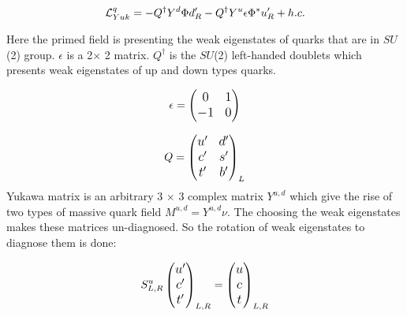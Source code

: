 \begin{equation}
\large
\mathcal{L}_{Yuk}^q = 
-{Q}^\dag Y^d \Phi d_R^\prime 
-{Q}^\dag Y^u \epsilon \Phi^* u_R^\prime
+ h.c.
\end{equation}

Here the primed field is presenting the weak eigenstates of quarks that are in $SU$(2) group. $\epsilon$ is a 2$\times$ 2 matrix. $Q^\dag$ is the $SU$(2) left-handed doublets which presents weak eigenstates of up and down types quarks. 

\begin{equation}
\large
\epsilon =  
\begin{pmatrix}
0 & 1\\
-1 & 0
\end{pmatrix}
\end{equation}

\begin{equation}
\large
Q =  
\begin{pmatrix}
u^\prime & d^\prime \\
c^\prime & s^\prime \\
t^\prime & b^\prime
\end{pmatrix}_L
\end{equation}
Yukawa matrix is an arbitrary 3 $\times$ 3 complex matrix $Y^{u,d}$ which give the rise of two types of massive quark field $M^{u,d}=Y^{u,d}\nu$. The choosing the weak eigenstates makes these matrices un-diagnosed. So the rotation of weak eigenstates to diagnose them is done:

\begin{equation}
\large
S_{L,R}^{u}
\begin{pmatrix}
u^\prime   \\
c^\prime  \\
t^\prime 
\end{pmatrix}_{L,R}
= \begin{pmatrix}
u  \\
c  \\
t 
\end{pmatrix}_{L,R}
\end{equation}

